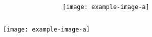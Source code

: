 \documentclass{beamer}
\begin{document}
  \begin{frame}
    \begin{columns}[T,onlytextwidth]
        \begin{column}{.23\textwidth}
        \end{column}
        \begin{column}{.48\textwidth}
                \texttt{[image: example-image-a]}
        \end{column}
            \begin{column}{.23\textwidth}
            \end{column}
      \end{columns}
  \end{frame}

  \begin{frame}
    \begin{columns}[T,onlytextwidth]
        \begin{column}{.48\textwidth}
                \texttt{[image: example-image-a]}
        \end{column}    
        \begin{column}{.48\textwidth}

            \end{column}
      \end{columns}
  \end{frame}
\end{document}
